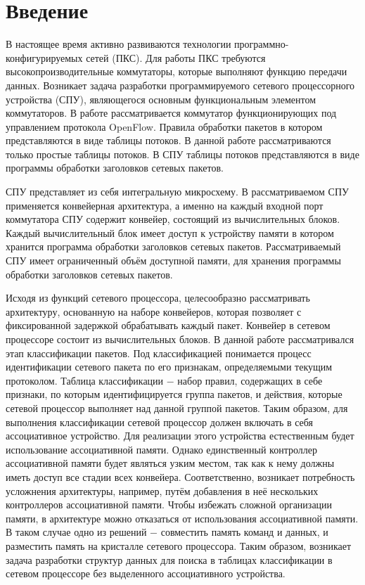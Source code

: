 \documentclass[a4paper, 12pt, titlepage, finall]{extreport}
\begin{document}
    \chapter*{Введение}
        В настоящее время активно развиваются технологии программно-конфигурируемых сетей (ПКС). Для работы ПКС требуются высокопроизводительные коммутаторы, 
        которые выполняют функцию передачи данных. Возникает задача разработки программируемого сетевого процессорного устройства (СПУ),
        являющегося основным функциональным элементом коммутаторов. В работе рассматривается коммутатор функционирующих под управлением протокола OpenFlow.
        Правила обработки пакетов в котором представляются в виде таблицы потоков. В данной работе рассматриваются только простые таблицы потоков.
        В СПУ таблицы потоков представляются в виде программы обработки заголовков сетевых пакетов.


        СПУ представляет из себя интегральную микросхему. В рассматриваемом СПУ применяется конвейерная архитектура,
        а именно на каждый входной порт коммутатора СПУ содержит конвейер, состоящий из вычислительных блоков. Каждый вычислительный блок имеет доступ к 
        устройству памяти в котором хранится программа обработки заголовков сетевых пакетов. Рассматриваемый СПУ имеет ограниченный объём доступной
        памяти, для хранения программы обработки заголовков сетевых пакетов.
        
        Исходя из функций сетевого процессора, целесообразно рассматривать архитектуру, основанную на
        наборе конвейеров, которая позволяет с фиксированной задержкой обрабатывать каждый пакет. 
        Конвейер в сетевом процессоре состоит из вычислительных блоков. В данной работе рассматривался этап классификации пакетов. 
        Под классификацией понимается процесс идентификации сетевого пакета по его признакам, определяемыми текущим протоколом.
        Таблица классификации $-$ набор правил, содержащих в себе признаки, по которым идентифицируется группа пакетов,
        и действия, которые сетевой процессор выполняет над данной группой пакетов. 
        Таким образом, для выполнения классификации сетевой процессор должен включать в себя ассоциативное устройство. Для реализации этого устройства естественным будет использование 
        ассоциативной памяти. Однако единственный контроллер ассоциативной памяти будет являться узким местом, так как к нему должны иметь доступ все стадии всех конвейера.
        Соответственно, возникает потребность усложнения архитектуры, например, путём добавления в неё нескольких контроллеров ассоциативной памяти.
        Чтобы избежать сложной организации памяти, в архитектуре можно отказаться от использования ассоциативной памяти. 
        В таком случае одно из решений $-$ совместить память команд и данных, и разместить память на кристалле сетевого процессора.
        Таким образом, возникает задача разработки структур данных для поиска в таблицах классификации в сетевом процессоре без выделенного ассоциативного устройства.
 
\end{document}

